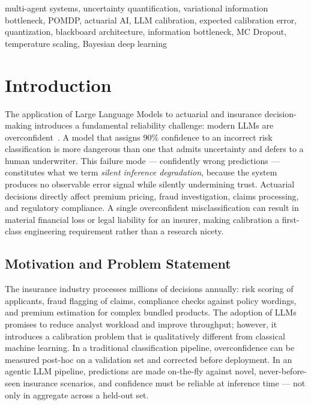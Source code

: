 \documentclass[conference]{IEEEtran}
\begin{document}
\begin{IEEEkeywords}
multi-agent systems, uncertainty quantification, variational information
bottleneck, POMDP, actuarial AI, LLM calibration, expected calibration
error, quantization, blackboard architecture, information bottleneck,
MC Dropout, temperature scaling, Bayesian deep learning
\end{IEEEkeywords}

\section{Introduction}
\label{sec:intro}

The application of Large Language Models to actuarial and insurance
decision-making introduces a fundamental reliability challenge: modern
LLMs are overconfident~\cite{guo2017calibration}. A model that assigns
90\% confidence to an incorrect risk classification is more dangerous
than one that admits uncertainty and defers to a human underwriter.
This failure mode --- confidently wrong predictions --- constitutes
what we term \textit{silent inference degradation}, because the system
produces no observable error signal while silently undermining trust.
Actuarial decisions directly affect premium pricing, fraud
investigation, claims processing, and regulatory compliance. A single
overconfident misclassification can result in material financial loss
or legal liability for an insurer, making calibration a first-class
engineering requirement rather than a research nicety.

\subsection{Motivation and Problem Statement}

The insurance industry processes millions of decisions annually: risk
scoring of applicants, fraud flagging of claims, compliance checks
against policy wordings, and premium estimation for complex bundled
products. The adoption of LLMs promises to reduce analyst workload and
improve throughput; however, it introduces a calibration problem that
is qualitatively different from classical machine learning. In a
traditional classification pipeline, overconfidence can be measured
post-hoc on a validation set and corrected before deployment.
In an agentic LLM pipeline, predictions are made on-the-fly against
novel, never-before-seen insurance scenarios, and confidence must be
reliable at inference time --- not only in aggregate across a held-out
set.
\end{document}
